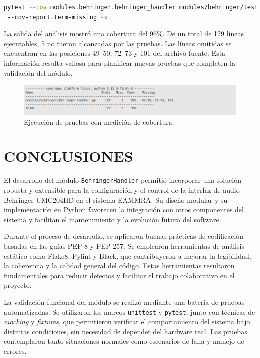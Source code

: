 \begin{lstlisting}[language=bash] 
pytest --cov=modules.behringer.behringer_handler modules/behringer/tests/
 --cov-report=term-missing -v 
\end{lstlisting}

La salida del análisis mostró una cobertura del 96\%. De un total de 129 líneas ejecutables, 5 no fueron alcanzadas por las pruebas. Las líneas omitidas se encuentran en las posiciones 49–50, 72–73 y 101 del archivo fuente. Esta información resulta valiosa para planificar nuevas pruebas que completen la validación del módulo.

\begin{figure}[htpb]
    \centering
    \includegraphics[width=\textwidth]{graficos/coverage.png}
    \caption{Ejecución de pruebas con medición de cobertura.}
    \label{fig:testCov}
\end{figure}


\clearpage
\section{CONCLUSIONES}

El desarrollo del módulo \texttt{BehringerHandler} permitió incorporar una solución robusta y extensible para la configuración y el control de la interfaz de audio Behringer UMC204HD en el sistema EAMMRA. Su diseño modular y su implementación en Python favorecen la integración con otros componentes del sistema y facilitan el mantenimiento y la evolución futura del software.

Durante el proceso de desarrollo, se aplicaron buenas prácticas de codificación basadas en las guías PEP-8 y PEP-257. Se emplearon herramientas de análisis estático como Flake8, Pylint y Black, que contribuyeron a mejorar la legibilidad, la coherencia y la calidad general del código. Estas herramientas resultaron fundamentales para reducir defectos y facilitar el trabajo colaborativo en el proyecto.

La validación funcional del módulo se realizó mediante una batería de pruebas automatizadas. Se utilizaron los marcos \texttt{unittest} y \texttt{pytest}, junto con técnicas de \textit{mocking} y \textit{fixtures}, que permitieron verificar el comportamiento del sistema bajo distintas condiciones, sin necesidad de depender del hardware real. Las pruebas contemplaron tanto situaciones normales como escenarios de falla y manejo de errores.

